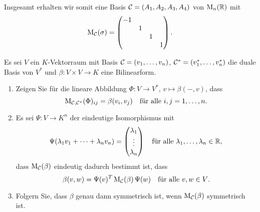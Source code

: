 \documentclass[a4paper, 10pt]{scrartcl}
\begin{document}
\begin{solution}
\begin{enumerate}[leftmargin=*]
      Insgesamt erhalten wir somit eine Basis $\mathcal{C} = (A_1, A_2, A_3, A_4)$ von $\mathrm{M}_n(\mathbb{R})$ mit
      \[
        \mathrm{M}_{\mathcal{C}}(\sigma)
        =
        \begin{pmatrix}
          -1  &   &   &   \\
              & 1 &   &   \\
              &   & 1 &   \\
              &   &   & 1
        \end{pmatrix}.
      \]
  \end{enumerate}
\end{solution}


\begin{question}
  Es sei $V$ ein $K$-Vektorraum mit Basis $\mathcal{C} = (v_1, \dotsc, v_n)$, $\mathcal{C}^* = (v_1^*, \dotsc, v_n^*)$ die duale Basis von $V^*$ und $\beta \colon V \times V \to K$ eine Bilinearform.
  \begin{enumerate}[leftmargin=*]
    \item
      Zeigen Sie für die lineare Abbildung $\Phi \colon V \to V^*$, $v \mapsto \beta(-,v)$, dass
      \[
        \mathrm{M}_{\mathcal{C}, \mathcal{C}^*}(\Phi)_{ij} = \beta(v_i, v_j)
        \quad
        \text{für alle $i, j = 1, \dotsc, n$}.
      \]
    \item
      Es sei $\Psi \colon V \to K^n$ der eindeutige Isomorphismus mit
      \[
          \Psi(\lambda_1 v_1 + \dotsb + \lambda_n v_n)
        = \begin{pmatrix} \lambda_1 \\ \vdots \\ \lambda_n \end{pmatrix}
        \quad
        \text{für alle $\lambda_1, \dotsc, \lambda_n \in \mathbb{R}$},
      \]
      dass $\mathrm{M}_{\mathcal{C}}(\beta)$ eindeutig dadurch bestimmt ist, dass
      \[
        \beta(v, w) = \Psi(v)^T \, \mathrm{M}_{\mathcal{C}}(\beta) \, \Psi(w)
        \quad
        \text{für alle $v, w \in V$}.
      \]
    \item
      Folgern Sie, dass $\beta$ genau dann symmetrisch ist, wenn $\mathrm{M}_{\mathcal{C}}(\beta)$ symmetrisch ist.
  \end{enumerate}
\end{question}
\end{document}
